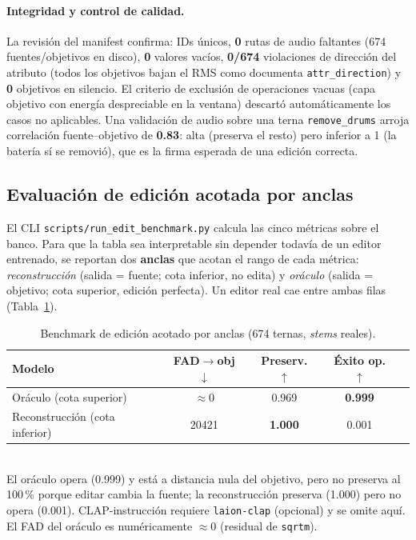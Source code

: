 \paragraph{Integridad y control de calidad.} La revisión del manifest confirma:
IDs únicos, \textbf{0} rutas de audio faltantes (674 fuentes/objetivos en disco),
\textbf{0} valores vacíos, \textbf{0/674} violaciones de dirección del atributo
(todos los objetivos bajan el RMS como documenta \texttt{attr\_direction}) y
\textbf{0} objetivos en silencio. El criterio de exclusión de operaciones vacuas
(capa objetivo con energía despreciable en la ventana) descartó automáticamente
los casos no aplicables. Una validación de audio sobre una terna \texttt{remove\_drums}
arroja correlación fuente--objetivo de \textbf{0.83}: alta (preserva el resto) pero
inferior a 1 (la batería sí se removió), que es la firma esperada de una edición
correcta.

\subsection{Evaluación de edición acotada por anclas}
\label{sec:res:edicion:anclas}

El CLI \texttt{scripts/run\_edit\_benchmark.py} calcula las cinco métricas sobre
el banco. Para que la tabla sea interpretable sin depender todavía de un editor
entrenado, se reportan dos \textbf{anclas} que acotan el rango de cada métrica:
\textit{reconstrucción} (salida = fuente; cota inferior, no edita) y
\textit{oráculo} (salida = objetivo; cota superior, edición perfecta). Un editor
real cae entre ambas filas (Tabla~\ref{tab:res-anclas}).

\begin{table}[t]
  \caption{Benchmark de edición acotado por anclas (674 ternas, \textit{stems} reales).}
  \label{tab:res-anclas}
  \centering
  \begin{tabular}{lcccc}
    \hline
    \textbf{Modelo} & \textbf{FAD$\to$obj $\downarrow$} & \textbf{Preserv. $\uparrow$} & \textbf{Éxito op. $\uparrow$} \\
    \hline
    Oráculo (cota superior)       & $\approx 0$ & 0.969 & \textbf{0.999} \\
    Reconstrucción (cota inferior) & 20421 & \textbf{1.000} & 0.001 \\
    \hline
  \end{tabular}
  \smallskip\\
  \footnotesize{El oráculo opera (0.999) y está a distancia nula del objetivo, pero
  no preserva al 100\,\% porque editar cambia la fuente; la reconstrucción preserva
  (1.000) pero no opera (0.001). CLAP-instrucción requiere \texttt{laion-clap}
  (opcional) y se omite aquí. El FAD del oráculo es numéricamente $\approx 0$
  (residual de \texttt{sqrtm}).}
\end{table}

